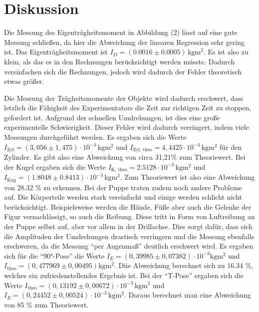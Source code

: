 \section{Diskussion}
\label{sec:Diskussion}

Die Messung des Eigenträgheitsmoment in Abbildung (2) lässt auf eine gute Messung schließen,
da hier die Abweichung der linearen Regression sehr gering ist.
Das Eigenträgheitsmoment ist $I_{D} =  (0.0016 \pm 0.0005) \, \unit{\kilo\gram\meter\squared}$.
Es ist also zu klein, als das es in den Rechnungen berücksichtigt werden müsste.
Dadurch vereinfachen sich die Rechnungen, jedoch wird dadurch der Fehler theoretisch etwas größer.

Die Messung der Trägheitsmomente der Objekte wird dadurch erschwert, dass letzlich die Fähigkeit des Experimentators die Zeit zur 
richtigen Zeit zu stoppen, gefordert ist.
Aufgrund der schnellen Umdrehungen, ist dies eine große experimentelle Schwierigkeit.
Dieser Fehler wird dadurch verringert, indem viele Messungen durchgeführt werden.
Es ergaben sich die Werte $I_{\text{Zyl}} = (3,056 \pm 1,475) \cdot 10^{-4} \, \unit{\kilo\gram\meter\squared}$
und $I_{\text{Zyl, theo}} = 4,4425 \cdot 10^{-4} \, \unit{\kilo\gram\meter\squared}$ für den Zylinder. Es gibt also eine Abweichung
von circa 31,21\% zum Theoriewert.
Bei der Kugel ergaben sich die Werte $ I_{\text{K, theo}} = 2.5128 \cdot 10^{-3} \, \unit{\kilo\gram\meter\squared}$ und
$ I_{\text{Kug}} = (1.8048 \pm 0.8413) \cdot 10^{-3} \, \unit{\kilo\gram\meter\squared}$. Zum Theoriewert ist also eine Abweichung von
28.32 \% zu erkennen.
Bei der Puppe traten zudem noch andere Probleme auf.
Die Körperteile werden stark vereinfacht und einige werden schlicht nicht berücksichtigt.
Beispielsweise werden die Hände, Füße aber auch die Gelenke der Figur vernachlässigt, so auch die Reibung.
Diese tritt in Form von Luftreibung an der Puppe selbst auf, aber vor allem in der Drillachse.
Dies sorgt dafür, dass sich die Amplituden der Umdrehungen drastisch verringern und die Messung ebenfalls erschweren, da die
Messung \enquote{per Augenmaß} deutlich erschwert wird.
Es ergaben sich für die \enquote{90°-Pose} die Werte $I_E =( 0,39985 \pm 0,07382) \cdot 10^{-3}  \unit{\kilo\gram\meter\squared}$ und
$I_{\text{theo}} = (0,477969 \pm 0,00495)  \unit{\kilo\gram\meter\squared}$. Diie Abweichung berechnet sich zu 16.34 \%,
welches ein zufriedenstellendes Ergebnis ist.
Bei der \enquote{T-Pose} ergaben sich die Werte $I_{\text{theo}} = (0,13192 \pm 0,00672) \cdot 10^{-3} \, \unit{\kilo\gram\meter\squared}$
und  $I_E = (0,24452 \pm 0,00524)  \cdot 10^{-3} \, \unit{\kilo\gram\meter\squared}$.
Daraus berechnet man eine Abweichung von 85 \% zum Theoriewert.
\nocite{matplotlib}
\nocite{numpy}